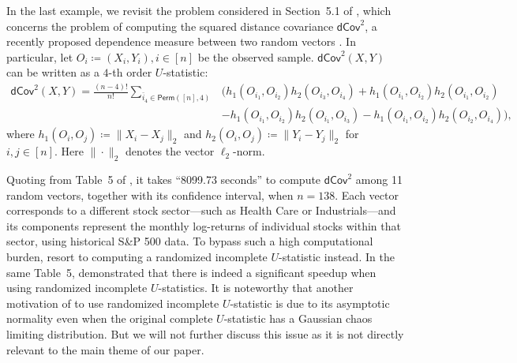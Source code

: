 \documentclass[letterpaper,11pt]{article}
\newcommand{\perm}[1]{\mathsf{Perm}(#1)}
\begin{document}
\begin{bibunit}[plainnat]
In the last example, we revisit the problem considered in Section~5.1 of \citet{shao2025u}, which concerns the problem of computing the squared distance covariance $\mathsf{dCov}^2$, a recently proposed dependence measure between two random vectors \citep{szekely2007measuring, yao2018testing}. In particular, let $O_i \coloneqq (X_i, Y_i), i \in [n]$ be the observed sample. $\mathsf{dCov}^2 (X, Y)$ can be written as a $4$-th order $U$-statistic:
\begin{align*}
    \mathsf{dCov}^2(X, Y) = \frac{(n - 4)!}{n!} \sum_{\bar{i}_{4} \in \perm{[n],4}} & \Bigg( h_1 (O_{i_1}, O_{i_2}) h_2 (O_{i_3}, O_{i_4}) + h_1 (O_{i_1}, O_{i_2}) h_2 (O_{i_1}, O_{i_2}) \\
    & - h_1 (O_{i_1}, O_{i_2}) h_2 (O_{i_1}, O_{i_3}) - h_1 (O_{i_1}, O_{i_2}) h_2 (O_{i_2}, O_{i_4}) \Bigg), 
\end{align*}
where $h_1 (O_i, O_j) \coloneqq \|X_i - X_j\|_2$ and $h_2 (O_i, O_j) \coloneqq \|Y_i - Y_j\|_2$ for $i, j \in [n]$. Here $\|\cdot\|_2$ denotes the vector $\ell_2$-norm. 

Quoting from Table~5 of \citet{shao2025u}, it takes ``8099.73 seconds'' to compute $\mathsf{dCov}^2$ among 11 random vectors, together with its confidence interval, when $n = 138$. Each vector corresponds to a different stock sector—such as Health Care or Industrials—and its components represent the monthly log-returns of individual stocks within that sector, using historical S\&P 500 data. To bypass such a high computational burden, \citet{shao2025u} resort to computing a randomized incomplete $U$-statistic instead. In the same Table~5, \citet{shao2025u} demonstrated that there is indeed a significant speedup when using randomized incomplete $U$-statistics. It is noteworthy that another motivation of \citet{shao2025u} to use randomized incomplete $U$-statistic is due to its asymptotic normality \citep{chen2019randomized} even when the original complete $U$-statistic has a Gaussian chaos limiting distribution. But we will not further discuss this issue as it is not directly relevant to the main theme of our paper.


\end{bibunit}
\end{document}
